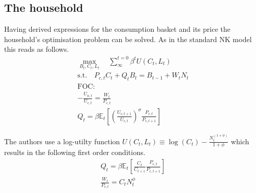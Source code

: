 \documentclass[12pt,a4paper,english]{article} %
\newcommand{\E}{\mathbb{E}} %
\begin{document}
	\subsection{The household}
	Having derived expressions for the consumption basket and its price the household's optimisation problem can be solved. As in the standard NK model this reads as follows. 
	\begin{equation}
		\begin{aligned}
			\max_{B_t, C_t, L_t} \quad \sum_{\infty}^{t=0} \beta^{t} U(C_{t}, L_{t}) \\
			\textrm{s.t.} \quad P_{c,t} C_t + Q_t B_t = B_{t-1} + W_t N_t \\
			\textrm{FOC:} \\
			- \frac{U_{n,t}}{U_{c, t}} = \frac{W_t}{P_{c,t}}\\
			Q_t = \beta \E_t \left[ \left( \frac{U_{c, t+1}}{U_{c,t}} \right)^\sigma \frac{P_{c,t}}{P_{c,t+1}} \right] 			
		\end{aligned}
	\end{equation}
	
	The authors use a log-utilty function $U(C_t,L_t) \equiv \log(C_t) - \frac{N_t^{(1+\phi)}}{1+\phi}$ which results in the following first order conditions.
	\begin{equation}
		\begin{aligned}
			Q_t = \beta \E_t \left[ \frac{C_t}{C_{t+1}} \frac{P_{c,t}}{P_{c,t+1}} \right] \\
			\frac{W_t}{P_{c,t}} = C_t N_t^\phi
		\end{aligned}
	\end{equation}
\end{document}
